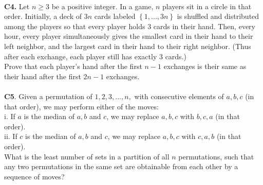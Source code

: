 \documentclass[12pt,a4paper]{article}
\begin{document}
\\
\textbf{C4.} Let \(n \ge 3\) be a positive integer. In a game, \(n\) players sit in a circle in that order. Initially, a deck of \(3n\) cards labeled \(\left\{ {1,...,3n} \right\}\) is shuffled and distributed among the players so that every player holds \(3\) cards in their hand. Then, every hour, every player simultaneously gives the smallest card in their hand to their left neighbor, and the largest card in their hand to their right neighbor. (Thus after each exchange, each player still has exactly \(3\) cards.)\\
Prove that each player's hand after the first \(n - 1\) exchanges is their same as their hand after the first \(2n - 1\) exchanges.\\
\\
\textbf{C5}. Given a permutation of \(1, 2, 3, ..., n,\) with consecutive elements of \(a, b, c\) (in that order), we may perform either of the moves:\\
i. If \(a\) is the median of \(a, b\) and \(c\), we may replace \(a, b, c\) with \(b, c, a\) (in that order).\\
ii. If \(c\) is the median of \(a, b\) and \(c\), we may replace \(a, b, c\) with \(c, a, b\) (in that order).\\
What is the least number of sets in a partition of all \(n \! \) permutations, such that any two permutations in the same set are obtainable from each other by a sequence of moves?\\
\\
\newpage
\end{document}
